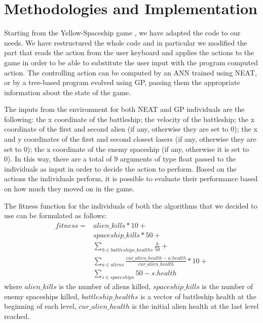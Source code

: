 
\section{Methodologies and Implementation}

Starting from the Yellow-Spaceship game \cite{Yellow-Spaceship}, we have adapted the code to our needs. We
have restructured the whole code and in particular we modified the part that reads the action
from the user keyboard and applies the actions to the game in order to be able to substitute
the user input with the program computed action. The controlling action can be computed by
an ANN trained using NEAT, or by a tree-based program evolved using GP, passing them
the appropriate information about the state of the game.

The inputs from the environment for both NEAT and GP individuals are the following:
the x coordinate of the battleship; the velocity of the battleship;
the x coordinate of the first and second alien (if any, otherwise they are set to 0);
the x and y coordinates of the first and second closest lasers (if any, otherwise they are set to 0);
the x coordinate of the enemy spaceship (if any, otherwise it is set to 0).
In this way, there are a total of 9 arguments of type float passed to the individuals as input in
order to decide the action to perform. Based on the actions the individuals perform, it is
possible to evaluate their performance based on how much they moved on in the game.

The fitness function for the individuals of both the algorithms that we decided to use can be
formulated as follows:
\begin{equation}
\begin{split}
    fitness = & alien\_kills * 10 + \\
              & spaceship\_kills * 50 + \\
              & \sum_{h \in battleships\_healths}^{} \frac{h}{50} + \\
              & \sum_{a \in aliens}^{} \frac{cur\_alien\_health - a.health}{cur\_alien\_health} * 10 + \\
              & \sum_{s \in spaceships}^{} 50 - s.health
\end{split}
\end{equation}
where $alien\_kills$ is the number of aliens killed, 
$spaceship\_kills$ is the number of enemy spaceships killed,
$battleship\_healths$ is a vector of battleship health at the beginning of each level,
$cur\_alien\_health$ is the initial alien health at the last level reached. 

